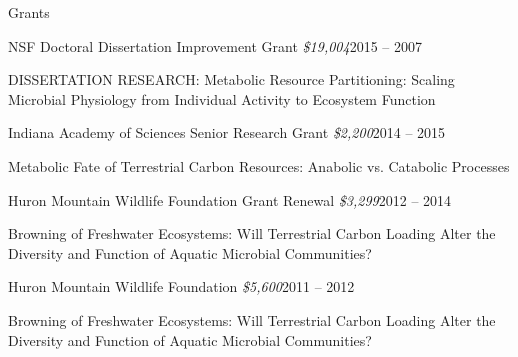 \documentclass{resume} %
\begin{document}
\begin{rSection}{Grants}

    \begin{rSubsection}{NSF Doctoral Dissertation Improvement Grant
      {\normalfont \em \$19,004}}{2015 -- 2007}{}{}
      \item DISSERTATION RESEARCH: Metabolic Resource Partitioning: Scaling
      Microbial Physiology from Individual Activity to Ecosystem Function
    \end{rSubsection}

    \begin{rSubsection}{Indiana Academy of Sciences Senior Research Grant
      {\normalfont \em \$2,200}}{2014 -- 2015}{}{}
      \item Metabolic Fate of Terrestrial Carbon Resources: Anabolic vs.
      Catabolic Processes
    \end{rSubsection}

    \begin{rSubsection}{Huron Mountain Wildlife Foundation Grant Renewal
      {\normalfont \em \$3,299}}{2012 -- 2014}{}{}
      \item Browning of Freshwater Ecosystems: Will Terrestrial Carbon Loading
      Alter the Diversity and Function of Aquatic Microbial Communities?
    \end{rSubsection}

    \begin{rSubsection}{Huron Mountain Wildlife Foundation
      {\normalfont \em \$5,600}}{2011 -- 2012}{}{}
      \item Browning of Freshwater Ecosystems: Will Terrestrial Carbon Loading
      Alter the Diversity and Function of Aquatic Microbial Communities?
    \end{rSubsection}

\end{rSection}

\end{document}
